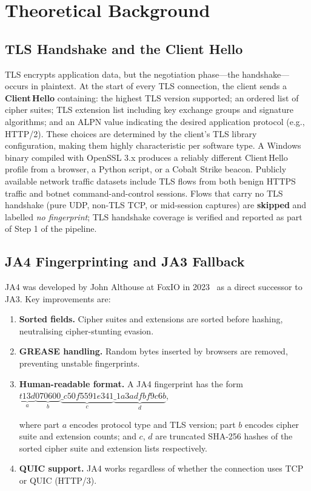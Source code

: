 \documentclass[12pt,a4paper]{report}
\begin{document}
\begin{longtable}
\end{longtable}

\section{Theoretical Background}

\subsection{TLS Handshake and the Client Hello}

TLS encrypts application data, but the negotiation phase---the handshake---occurs
in plaintext. At the start of every TLS connection, the client sends a
\textbf{Client\,Hello} containing: the highest TLS version supported; an ordered
list of cipher suites; TLS extension list including key exchange groups and
signature algorithms; and an ALPN value indicating the desired application
protocol (e.g., HTTP/2). These choices are determined by the client's TLS library
configuration, making them highly characteristic per software type. A Windows
binary compiled with OpenSSL 3.x produces a reliably different Client\,Hello
profile from a browser, a Python script, or a Cobalt Strike beacon. Publicly available network traffic datasets include TLS flows from both benign HTTPS traffic and botnet command-and-control sessions. Flows that carry no TLS handshake (pure UDP,
non-TLS TCP, or mid-session captures) are \textbf{skipped} and labelled
\textit{no fingerprint}; TLS handshake coverage is verified and reported as
part of Step 1 of the pipeline.

\subsection{JA4 Fingerprinting and JA3 Fallback}

JA4 was developed by John Althouse at FoxIO in 2023~\cite{althouse2023ja4} as
a direct successor to JA3. Key improvements are:

\begin{enumerate}[leftmargin=*, label=\arabic*.]
  \item \textbf{Sorted fields.} Cipher suites and extensions are sorted before
  hashing, neutralising cipher-stunting evasion.
  \item \textbf{GREASE handling.} Random bytes inserted by browsers are removed,
  preventing unstable fingerprints.
  \item \textbf{Human-readable format.} A JA4 fingerprint has the form
  \newline$\underbrace{t13d}_{a}\underbrace{070600}_{b}\underbrace{\_c50f5591e341}_{c}\underbrace{\_1a3adfbf9c6b}_{d}$,
  
  where part $a$ encodes protocol type and TLS version; part $b$ encodes cipher
  suite and extension counts; and $c$, $d$ are truncated SHA-256 hashes of the
  sorted cipher suite and extension lists respectively.
  \item \textbf{QUIC support.} JA4 works regardless of whether the connection uses
  TCP or QUIC (HTTP/3).
\end{enumerate}
\end{document}
